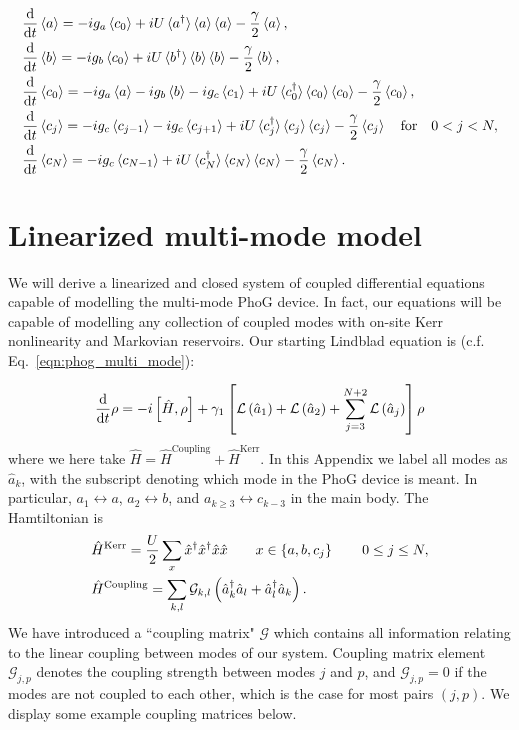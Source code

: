 \begin{align}
&\ddt \ev{a} = - i g_a \ev{c_0} + i U \ev*{a^\dagger} \ev{a} \ev{a} - \frac{\gamma}{2} \ev{a}, \notag \\
%
&\ddt \ev{b} = - i g_b \ev{c_0} + i U \ev*{b^\dagger}\ev{b} \ev{b} - \frac{\gamma}{2} \ev{b}, \notag \\
%
&\ddt \ev{c_0} = - i g_a \ev{a} - i g_b \ev{b} - i g_c \ev{c_1} + i U \ev*{c_0^\dagger} \ev{c_0} \ev{c_0} - \frac{\gamma}{2} \ev{c_0}, \notag \\
%
&\ddt \ev{c_j} = - i g_c \ev{c_{j-1}} - i g_c \ev{c_{j+1}} + i U \ev*{c_j^\dagger} \ev{c_j} \ev{c_j} - \frac{\gamma}{2} \ev{c_j} \qq{for} 0< j < N, \notag \\
%
&\ddt \ev{c_N} = - i g_c \ev{c_{N-1}} + i U \ev*{c_N^\dagger}\ev{c_N} \ev{c_N} - \frac{\gamma}{2} \ev{c_N}.
\end{align}


\section{Linearized multi-mode model}\label{appendix:multi_mode_linear}
We will derive a linearized and closed system of coupled differential equations capable of modelling the multi-mode PhoG device. In fact, our equations will be capable of modelling any collection of coupled modes with on-site Kerr nonlinearity and Markovian reservoirs. Our starting Lindblad equation is (c.f. Eq.~\ref{eqn:phog_multi_mode}):

\begin{equation}
\frac{\mathrm{d}}{\mathrm{d}t} \rho = - i \left[\hat{H}, \rho\right] + \gamma_1 \left[\mathcal{L}\left(\hat{a}_1\right) + \mathcal{L}\left(\hat{a}_2\right) + \sum_{j=3}^{N+2} \mathcal{L}\left(\hat{a}_j\right) \right] \rho
\end{equation}
where we here take $\hat{H} = \hat{H}^{\text{Coupling}} + \hat{H}^{\text{Kerr}}$. In this Appendix we label all modes as $\hat{a}_k$, with the subscript denoting which mode in the PhoG device is meant. In particular, $a_1 \leftrightarrow a$, $a_2 \leftrightarrow b$, and $a_{k \ge 3} \leftrightarrow c_{k-3}$ in the main body. The Hamtiltonian is
\begin{align}
&\hat{H}^{\text{Kerr}} = \frac{U}{2} \sum_{x} \hat{x}^\dagger \hat{x}^\dagger \hat{x} \hat{x} \qq{} x \in \left\{a, b, c_j\right\} \qq{} 0 \le j \le N, \notag \\
%
&\hat{H}^{\text{Coupling}} = \sum_{k, l} \mathcal{G}_{k, l}\left(\hat{a}_k^\dagger \hat{a}_l + \hat{a}_l^\dagger \hat{a}_k \right).
\end{align}
We have introduced a ``coupling matrix" $\mathcal{G}$ which contains all information relating to the linear coupling between modes of our system. Coupling matrix element $\mathcal{G}_{j, p}$ denotes the coupling strength between modes $j$ and $p$, and $\mathcal{G}_{j, p} = 0$ if the modes are not coupled to each other, which is the case for most pairs $\left(j, p\right)$. We display some example coupling matrices below.
